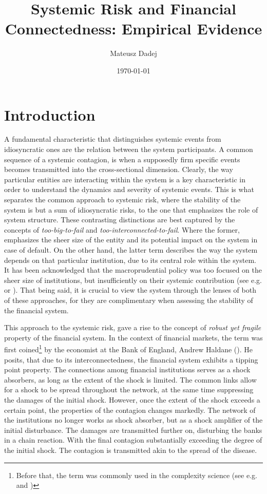 \documentclass[12pt]{article}
\title{Systemic Risk and Financial Connectedness: Empirical Evidence}
\author{Mateusz Dadej}
\date{\today}
\begin{document}
\maketitle

\section{Introduction}

A fundamental characteristic that distinguishes systemic events from idiosyncratic ones are the relation between the system participants. A common sequence of a systemic contagion, is when a supposedly firm specific events becomes transmitted into the cross-sectional dimension. Clearly, the way particular entities are interacting within the system is a key characteristic in order to understand the dynamics and severity of systemic events. This is what separates the common approach to systemic risk, where the stability of the system is but a sum of idiosyncratic risks, to the one that emphasizes the role of system structure. These contrasting distinctions are best captured by the concepts of \textit{too-big-to-fail} and \textit{too-interconnected-to-fail}. Where the former, emphasizes the sheer size of the entity and its potential impact on the system in case of default. On the other hand, the latter term describes the way the system depends on that particular institution, due to its central role within the system. It has been acknowledged that the macroprudential policy was too focused on the sheer size of institutions, but insufficiently on their systemic contribution (see e.g. \cite{bernanke09} or \cite{rajan09}). That being said, it is crucial to view the system through the lenses of both of these approaches, for they are complimentary when assessing the stability of the financial system.

This approach to the systemic risk, gave a rise to the concept of \textit{robust yet fragile} property of the financial system. In the context of financial markets, the term was first coined\footnote{Before that, the term was commonly used in the complexity science (see e.g. \cite{doyle05} and \cite{carlson02})} by the economist at the Bank of England, Andrew Haldane (\cite{haldane13}). He posits, that due to its interconnectedness, the financial system exhibits a tipping point property. The connections among financial institutions serves as a shock absorbers, as long as the extent of the shock is limited. The common links allow for a shock to be spread throughout the network, at the same time suppressing the damages of the initial shock. However, once the extent of the shock exceeds a certain point, the properties of the contagion changes markedly. The network of the institutions no longer works as shock absorber, but as a shock amplifier of the initial disturbance. The damages are transmitted further on, disturbing the banks in a chain reaction. With the final contagion substantially exceeding the degree of the initial shock. The contagion is transmitted akin to the spread of the disease. 
\end{document}
